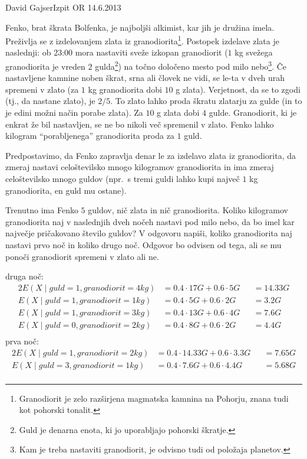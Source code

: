\begin{naloga}{David Gajser}{Izpit OR 14.6.2013}
\begin{vprasanje}
Fenko, brat škrata Bolfenka, je najboljši alkimist, kar jih je družina imela.
Preživlja se z izdelovanjem zlata iz granodiorita\footnote{
Granodiorit je zelo razširjena magmatska kamnina na Pohorju,
znana tudi kot pohorski tonalit.
}.
Postopek izdelave zlata je naslednji:
ob 23:00 mora nastaviti sveže izkopan granodiorit
($1$ kg svežega granodiorita je vreden $2$ gulda\footnote{
Guld je denarna enota, ki jo uporabljajo pohorski škratje.
})
na točno določeno mesto pod milo nebo\footnote{
Kam je treba nastaviti granodiorit, je odvisno tudi od položaja planetov.
}.
Če nastavljene kamnine noben škrat, srna ali človek ne vidi,
se le-ta v dveh urah spremeni v zlato
(za $1$ kg granodiorita dobi $10$ g zlata).
Verjetnost, da se to zgodi (tj., da nastane zlato), je $2/5$.
To zlato lahko proda škratu zlatarju za gulde
(in to je edini možni način porabe zlata).
Za $10$ g zlata dobi $4$ gulde.
Granodiorit, ki je enkrat že bil nastavljen,
se ne bo nikoli več spremenil v zlato.
Fenko lahko kilogram ``porabljenega'' granodiorita proda za $1$ guld.

Predpostavimo, da Fenko zapravlja denar le za izdelavo zlata iz granodiorita,
da zmeraj nastavi celoštevilsko mnogo kilogramov granodiorita
in ima zmeraj celoštevilsko mnogo guldov
(npr.~s tremi guldi lahko kupi največ $1$ kg granodiorita, en guld mu ostane).

Trenutno ima Fenko $5$ guldov, nič zlata in nič granodiorita.
Koliko kilogramov granodiorita
naj v naslednjih dveh nočeh nastavi pod milo nebo,
da bo imel kar največje pričakovano število guldov?
V odgovoru napiši,
koliko granodiorita naj nastavi prvo noč in koliko drugo noč.
Odgovor bo odvisen od tega,
ali se mu ponoči granodiorit spremeni v zlato ali ne.
\end{vprasanje}
\begin{odgovor}
druga noč:
\begin{alignat*}{2}
E(X \mid  guld = 1, granodiorit = 4kg) &= 0.4 \cdot 17 G + 0.6 \cdot 5 G &&= 14.33 G \\
E(X \mid  guld = 1, granodiorit = 1kg) &= 0.4 \cdot 5 G + 0.6 \cdot 2 G &&= 3.2 G \\
E(X \mid  guld = 1, granodiorit = 3kg) &= 0.4 \cdot 13 G + 0.6 \cdot 4 G &&= 7.6 G \\
E(X \mid  guld = 0, granodiorit = 2kg) &= 0.4 \cdot 8 G + 0.6 \cdot 2 G &&= 4.4 G \\
\end{alignat*}
prva noč:
\begin{alignat*}{2}
E(X \mid  guld = 1, granodiorit = 2kg) &= 0.4 \cdot 14.33 G + 0.6 \cdot 3.3 G &&= 7.65 G \\
E(X \mid  guld = 3, granodiorit = 1kg) &= 0.4 \cdot 7.6 G + 0.6 \cdot 4.4 G &&= 5.68 G \\
\end{alignat*}


\end{odgovor}
\end{naloga}
